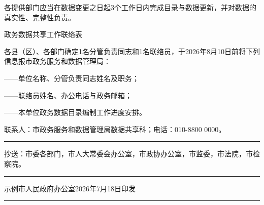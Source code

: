 \documentclass[linespread=1.81, twoside]{ctexart}
\begin{document}
各提供部门应当在数据变更之日起3个工作日内完成目录与数据更新，并对数据的
真实性、完整性负责。

\clearpage
{}\par
\par\nointerlineskip
\vspace{\baselineskip}
{\centering{}\xbsong 政务数据共享工作联络表\par}
\par\nointerlineskip
\vspace{\baselineskip}

各县（区）、各部门确定1名分管负责同志和1名联络员，于2026年8月10日前将下列
信息报市政务服务和数据管理局：

——单位名称、分管负责同志姓名及职务；

——联络员姓名、办公电话与政务邮箱；

——本单位政务数据目录编制工作进度安排。

联系人：市政务服务和数据管理局数据共享科；电话：010-8800 0000。

\vfill
\begingroup{}\setlength{\parindent}{0pt}%
\rule{\textwidth}{0.35mm}\par                    %
\vspace{0.25\baselineskip}
\hspace{1\ccwd}\begin{minipage}{\dimexpr\textwidth-2\ccwd\relax}
  \ccwd{}\relax
  抄送：市委各部门，市人大常委会办公室，市政协办公室，市监委，市法院，市检察院。\par
\end{minipage}\par
\vspace{0.25\baselineskip}
\rule{\textwidth}{0.25mm}\par                    %
\vspace{0.2\baselineskip}
\hspace{1\ccwd}示例市人民政府办公室\hfill 2026年7月18日印发\hspace*{1\ccwd}\par
\vspace{0.2\baselineskip}
\rule{\textwidth}{0.35mm}\par                    %
\endgroup
\end{document}
